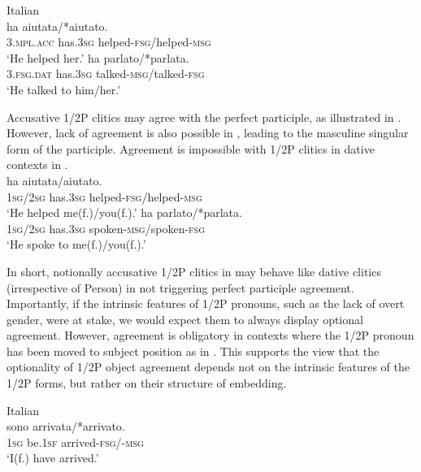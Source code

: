 \documentclass[output=paper,colorlinks,citecolor=brown,nonflat]{./langscibook}
\begin{document}
\ea%
    \label{ex:manzini:14}
    Italian\\
    \ea\label{ex:manzini:14a}
         {ha}     {aiutata/*aiutato}.\\
        \textsc{3.mpl.acc}  has.\textsc{3sg}    helped-\textsc{fsg/}helped\textsc{{}-msg}\\
    \glt ‘He helped her.’
    \ex\label{ex:manzini:14b}
           {ha}     {parlato/*parlata}.\\
        \textsc{3.fsg.dat}  has.\textsc{3sg}    talked-\textsc{msg/}talked\textsc{{}-fsg}\\
    \glt ‘He talked to him/her.’
    \z
\z

Accusative 1/2P clitics may agree with the perfect participle, as illustrated in . However, lack of agreement is also possible in , leading to the masculine singular form of the participle. Agreement is impossible with 1/2P clitics in dative contexts in .\\

\ea%
    \label{ex:manzini:15}
    \ea\label{ex:manzini:15a}
         {ha}     {aiutata/aiutato}.\\
        \textsc{1sg/2sg}  has\textsc{.3sg}    helped\textsc{{}-fsg/}helped\textsc{{}-msg}\\
    \glt ‘He helped me(f.)/you(f.).’
\ex\label{ex:manzini:15b}
            {ha}     {parlato/*parlata}.\\
        \textsc{1sg/2sg}  has\textsc{.3sg}    spoken\textsc{{}-msg/}spoken\textsc{{}-fsg}\\
    \glt ‘He spoke to me(f.)/you(f.).’
    \z
\z

In short, notionally accusative 1/2P clitics in  may behave like dative clitics (irrespective of Person) in not triggering perfect participle agreement. Importantly, if the intrinsic features of 1/2P pronouns, such as the lack of overt gender, were at stake, we would expect them to always display optional agreement. However, agreement is obligatory in contexts where the 1/2P pronoun has been moved to subject position as in . This supports the view that the optionality of 1/2P object agreement depends not on the intrinsic features of the 1/2P forms, but rather on their structure of embedding.

\ea%
    \label{ex:manzini:16}
    Italian\\
      {sono}     {arrivata/*arrivato}.\\
        \textsc{1sg}  be.\textsc{1sf}   arrived\textsc{{}-fsg/-msg}\\
    \glt ‘I(f.) have arrived.’
\z
\end{document}
